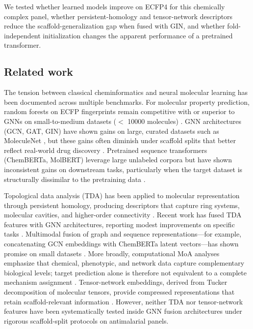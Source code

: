 \documentclass[11pt,a4paper]{article}
\begin{document}
We tested whether learned models improve on ECFP4 for this chemically complex panel, whether persistent-homology and tensor-network descriptors reduce the scaffold-generalization gap when fused with GIN, and whether fold-independent initialization changes the apparent performance of a pretrained transformer.

\subsection{Related work}

The tension between classical cheminformatics and neural molecular learning has been documented across multiple benchmarks. For molecular property prediction, random forests on ECFP fingerprints remain competitive with or superior to GNNs on small-to-medium datasets ($<$ \num{10000} molecules) \citep{guo_ding_2026,benchmark_pretrained_2025}. GNN architectures (GCN, GAT, GIN) have shown gains on large, curated datasets such as MoleculeNet \citep{wu_molnet_2018}, but these gains often diminish under scaffold splits that better reflect real-world drug discovery \citep{guo_ding_2026}. Pretrained sequence transformers (ChemBERTa, MolBERT) leverage large unlabeled corpora but have shown inconsistent gains on downstream tasks, particularly when the target dataset is structurally dissimilar to the pretraining data \citep{chemberta_2020,benchmark_pretrained_2025}.

Topological data analysis (TDA) has been applied to molecular representation through persistent homology, producing descriptors that capture ring systems, molecular cavities, and higher-order connectivity \citep{tda_review_2025}. Recent work has fused TDA features with GNN architectures, reporting modest improvements on specific tasks \citep{topology_molecular_representations_2025}. Multimodal fusion of graph and sequence representations---for example, concatenating GCN embeddings with ChemBERTa latent vectors---has shown promise on small datasets \citep{rollins2024molprop}. More broadly, computational MoA analyses emphasize that chemical, phenotypic, and network data capture complementary biological levels; target prediction alone is therefore not equivalent to a complete mechanism assignment \citep{Trapotsi2022MoA}. Tensor-network embeddings, derived from Tucker decomposition of molecular tensors, provide compressed representations that retain scaffold-relevant information \citep{tn_efficient_2026}. However, neither TDA nor tensor-network features have been systematically tested inside GNN fusion architectures under rigorous scaffold-split protocols on antimalarial panels.
\end{document}
